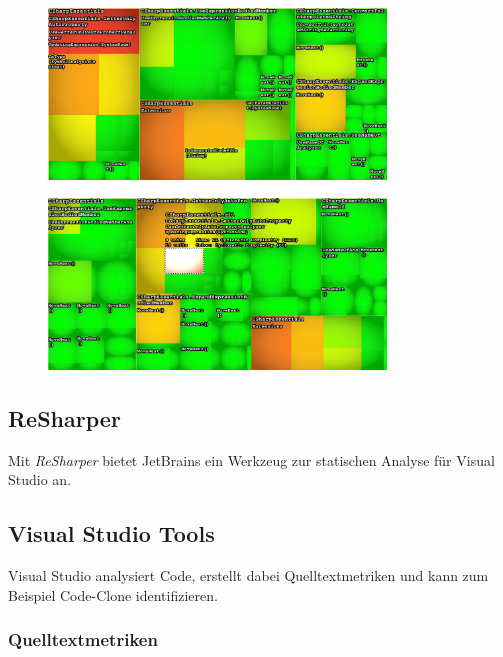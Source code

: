 \begin{figure}[ht]
	\centering
	\includegraphics[width=0.8\textwidth]{images/nd-cyclomatic-complexity.png}
	\caption{}
	\vspace{0.1cm}
	\label{fig:nd-cyclomatic-complexity}
\end{figure}

\begin{figure}[ht]
	\centering
	\includegraphics[width=0.8\textwidth]{images/nd-il-cyclomatic-complexity.png}
	\caption{}
	\vspace{0.1cm}
	\label{fig:nd-il-cyclomatic-complexity}
\end{figure}

\subsection{ReSharper}
Mit \emph{ReSharper} bietet JetBrains ein Werkzeug zur statischen Analyse für Visual Studio an.~\cite{resharper} 

\subsection{Visual Studio Tools}
Visual Studio analysiert Code, erstellt dabei Quelltextmetriken und kann zum Beispiel Code-Clone identifizieren.

\subsubsection{Quelltextmetriken}


